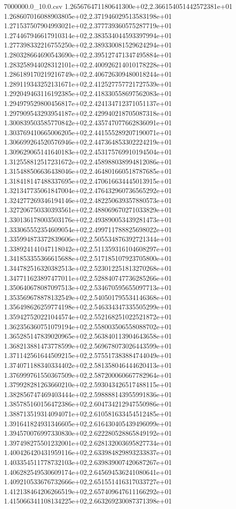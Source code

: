 \begin{filecontents*}{7000000.0_10.0.csv}
1.265676471180641300e+02,2.366154051442572381e+01
1.268607016088903805e+02,2.371946029513583198e+01
1.271537507904993021e+02,2.377739360575287719e+01
1.274467946617910314e+02,2.383534044593397994e+01
1.277398332216755250e+02,2.389330081529624294e+01
1.280328664690543690e+02,2.395127471347495884e+01
1.283258944028312101e+02,2.400926214010178228e+01
1.286189170219216749e+02,2.406726309480018244e+01
1.289119343252131671e+02,2.412527757721727539e+01
1.292049463116192385e+02,2.418330558697562083e+01
1.294979529800456817e+02,2.424134712371051137e+01
1.297909543293954187e+02,2.429940218705087318e+01
1.300839503585770842e+02,2.435747077662836091e+01
1.303769410665006205e+02,2.441555289207190071e+01
1.306699264520576946e+02,2.447364853302224219e+01
1.309629065141640183e+02,2.453175769910194504e+01
1.312558812517231672e+02,2.458988038994812086e+01
1.315488506636438046e+02,2.464801660518787685e+01
1.318418147488337695e+02,2.470616634445013915e+01
1.321347735061847004e+02,2.476432960736565292e+01
1.324277269346194146e+02,2.482250639357880573e+01
1.327206750330393561e+02,2.488069670271033829e+01
1.330136178003503176e+02,2.493890053439281473e+01
1.333065552354609054e+02,2.499711788825698022e+01
1.335994873372839606e+02,2.505534876392721344e+01
1.338924141047118042e+02,2.511359316104608297e+01
1.341853355366615688e+02,2.517185107923705800e+01
1.344782516320382513e+02,2.523012251813270268e+01
1.347711623897477011e+02,2.528840747736285266e+01
1.350640678087097513e+02,2.534670595655097713e+01
1.353569678878132549e+02,2.540501795534146368e+01
1.356498626259774198e+02,2.546334347335505299e+01
1.359427520221044574e+02,2.552168251022521872e+01
1.362356360751079194e+02,2.558003506558088702e+01
1.365285147839020965e+02,2.563840113904643658e+01
1.368213881473778599e+02,2.569678073026443599e+01
1.371142561644509215e+02,2.575517383884744049e+01
1.374071188340334402e+02,2.581358046444620413e+01
1.376999761550367509e+02,2.587200060667782964e+01
1.379928281263660210e+02,2.593043426517488115e+01
1.382856747469403444e+02,2.598888143955991836e+01
1.385785160156472386e+02,2.604734212947550986e+01
1.388713519314094071e+02,2.610581633454512485e+01
1.391641824931346605e+02,2.616430405439496099e+01
1.394570076997330830e+02,2.622280528865849192e+01
1.397498275501232001e+02,2.628132003695827734e+01
1.400426420431959116e+02,2.633984829893233837e+01
1.403354511778732103e+02,2.639839007420687267e+01
1.406282549530609174e+02,2.645694536241080641e+01
1.409210533676732666e+02,2.651551416317033727e+01
1.412138464206266519e+02,2.657409647611166292e+01
1.415066341108134225e+02,2.663269230087371398e+01

\end{filecontents*}

